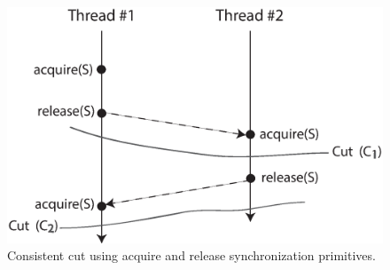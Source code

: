 
\begin{figure}[h]

\centering
      \includegraphics[scale=.3]{figure/snapshot-fig}
  \caption{Consistent cut using acquire and release synchronization primitives.}
   
  \label{fig:snapshot}

\end{figure}

